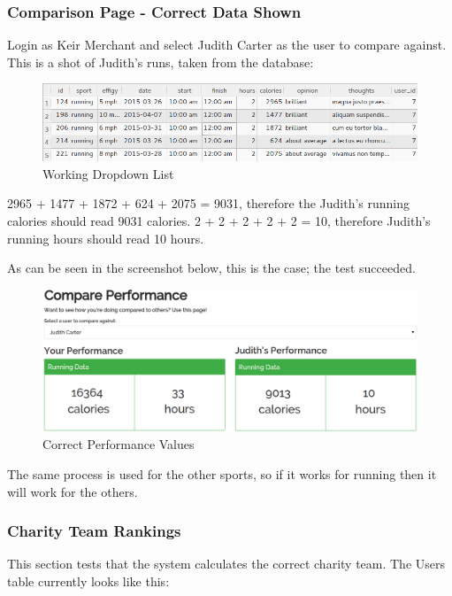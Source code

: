 \documentclass{article}[12pt,a4paper]
\begin{document}
{\subsubsection{Comparison Page - Correct Data Shown}
Login as Keir Merchant and select Judith Carter as the user to compare against. This is a shot of Judith's runs, taken from the database:

\begin{figure}[h!]
    \includegraphics[scale=0.35]{images/testing/compare_performance/judith_running}
    \caption{Working Dropdown List}
\end{figure}

2965 + 1477 + 1872 + 624 + 2075 = 9031, therefore the Judith's running calories should read 9031 calories.
2 + 2 + 2 + 2 + 2 = 10, therefore Judith's running hours should read 10 hours.

As can be seen in the screenshot below, this is the case; the test succeeded.

\begin{figure}[h!]
    \includegraphics[scale=0.35]{images/testing/compare_performance/performance}
    \caption{Correct Performance Values}
\end{figure}

The same process is used for the other sports, so if it works for running then it will work for the others.

\clearpage

\subsubsection{Charity Team Rankings}
This section tests that the system calculates the correct charity team. The Users table currently looks like this:

}
\end{document}
